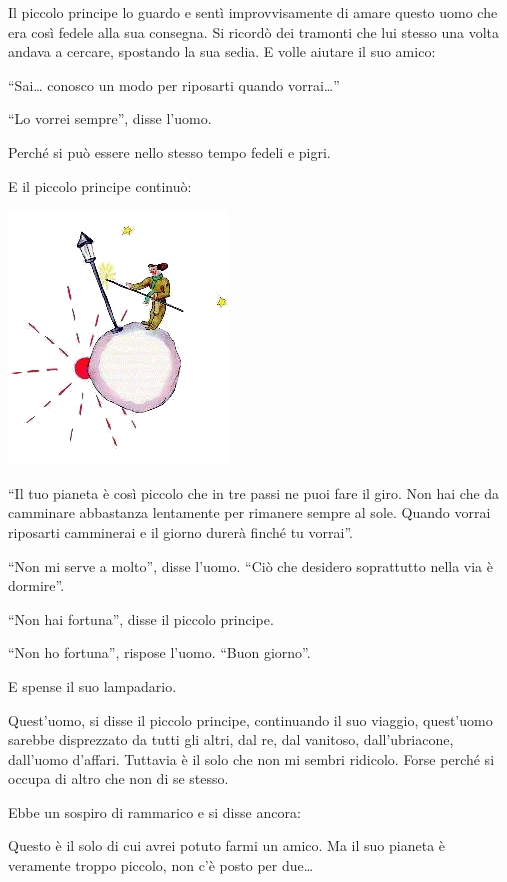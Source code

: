 \documentclass[11pt]{scrbook}
\begin{document}
Il piccolo principe lo guardo e sentì improvvisamente di amare questo uomo che era così fedele alla sua consegna. Si ricordò dei tramonti che lui stesso una volta andava a cercare, spostando la sua sedia. E volle aiutare il suo amico:

``Sai\ldots{} conosco un modo per riposarti quando vorrai\ldots{}''

``Lo vorrei sempre'', disse l'uomo.

Perché si può essere nello stesso tempo fedeli e pigri.

E il piccolo principe continuò:

\begin{center}
\includegraphics{img/14a}
\end{center}

``Il tuo pianeta è così piccolo che in tre passi ne puoi fare il giro. Non hai che da camminare abbastanza lentamente per rimanere sempre al sole. Quando vorrai riposarti camminerai e il giorno durerà finché tu vorrai''.

``Non mi serve a molto'', disse l'uomo. ``Ciò che desidero soprattutto nella via è dormire''.

``Non hai fortuna'', disse il piccolo principe.

``Non ho fortuna'', rispose l'uomo. ``Buon giorno''.

E spense il suo lampadario.

Quest'uomo, si disse il piccolo principe, continuando il suo viaggio, quest'uomo sarebbe disprezzato da tutti gli altri,  dal re, dal vanitoso, dall'ubriacone, dall'uomo d'affari. Tuttavia è il solo che non mi sembri ridicolo. Forse perché si occupa di altro che non di se stesso.

Ebbe un sospiro di rammarico e si disse ancora:

Questo è il solo di cui avrei potuto farmi un amico. Ma il suo pianeta è veramente troppo piccolo, non c'è posto per due\ldots{}
\end{document}

